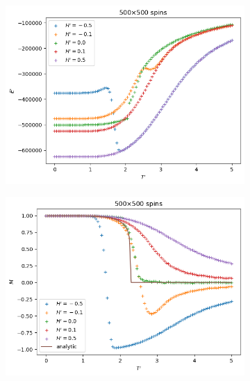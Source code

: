 \documentclass[11pt]{article}
\begin{document}
\begin{figure}[H]
    \centering
    \begin{subfigure}[H]{0.48\textwidth}
        \centering
        \includegraphics[width=\textwidth]{Meta/energy_N500_steps300000-30000000-6000000_Hsteps3000000.png}
        \caption{}
        \label{meta500Es}
    \end{subfigure}
    \hfill
    \centering
    \begin{subfigure}[H]{0.48\textwidth}
        \centering
        \includegraphics[width=\textwidth]{Meta/magnetization_N500_steps300000-30000000-6000000_Hsteps3000000.png}
        \caption{}
        \label{meta500Ms}
    \end{subfigure}


\end{figure}
\end{document}
